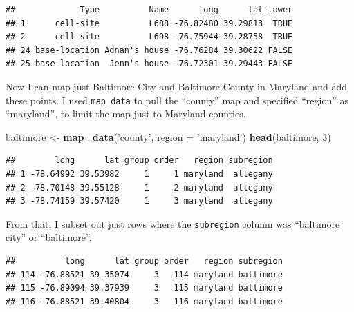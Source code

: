 \documentclass[]{book}
\makeatletter
\newenvironment{Shaded}{\begin{snugshade}}{\end{snugshade}}
\newcommand{\KeywordTok}[1]{\textcolor[rgb]{0.13,0.29,0.53}{\textbf{{#1}}}}
\newcommand{\DataTypeTok}[1]{\textcolor[rgb]{0.13,0.29,0.53}{{#1}}}
\newcommand{\DecValTok}[1]{\textcolor[rgb]{0.00,0.00,0.81}{{#1}}}
\newcommand{\StringTok}[1]{\textcolor[rgb]{0.31,0.60,0.02}{{#1}}}
\newcommand{\NormalTok}[1]{{#1}}
\newenvironment{kframe}{%
\medskip{}
\setlength{\fboxsep}{.8em}
 \def\at@end@of@kframe{}%
 \ifinner\ifhmode%
  \def\at@end@of@kframe{\end{minipage}}%
  \begin{minipage}{\columnwidth}%
 \fi\fi%
 \def\FrameCommand##1{\hskip\@totalleftmargin \hskip-\fboxsep
 \colorbox{shadecolor}{##1}\hskip-\fboxsep
     \hskip-\linewidth \hskip-\@totalleftmargin \hskip\columnwidth}%
 \MakeFramed {\advance\hsize-\width
   \@totalleftmargin\z@ \linewidth\hsize
   \@setminipage}}%
 {\par\unskip\endMakeFramed%
 \at@end@of@kframe}
\renewenvironment{Shaded}{\begin{kframe}}{\end{kframe}}
\makeatother
\begin{document}
\begin{verbatim}
##             Type          Name      long      lat tower
## 1      cell-site          L688 -76.82480 39.29813  TRUE
## 2      cell-site          L698 -76.75944 39.28758  TRUE
## 24 base-location Adnan's house -76.76284 39.30622 FALSE
## 25 base-location  Jenn's house -76.72301 39.29443 FALSE
\end{verbatim}

Now I can map just Baltimore City and Baltimore County in Maryland and
add these points. I used \texttt{map\_data} to pull the ``county'' map
and specified ``region'' as ``maryland'', to limit the map just to
Maryland counties.

\begin{Shaded}
\begin{Highlighting}[]
\NormalTok{baltimore <-}\StringTok{ }\KeywordTok{map_data}\NormalTok{(}\StringTok{'county'}\NormalTok{, }\DataTypeTok{region =} \StringTok{'maryland'}\NormalTok{)}
\KeywordTok{head}\NormalTok{(baltimore, }\DecValTok{3}\NormalTok{)}
\end{Highlighting}
\end{Shaded}

\begin{verbatim}
##        long      lat group order   region subregion
## 1 -78.64992 39.53982     1     1 maryland  allegany
## 2 -78.70148 39.55128     1     2 maryland  allegany
## 3 -78.74159 39.57420     1     3 maryland  allegany
\end{verbatim}

From that, I subset out just rows where the \texttt{subregion} column
was ``baltimore city'' or ``baltimore''.

\begin{Shaded}
\end{Shaded}

\begin{verbatim}
##          long      lat group order   region subregion
## 114 -76.88521 39.35074     3   114 maryland baltimore
## 115 -76.89094 39.37939     3   115 maryland baltimore
## 116 -76.88521 39.40804     3   116 maryland baltimore
\end{verbatim}
\end{document}
